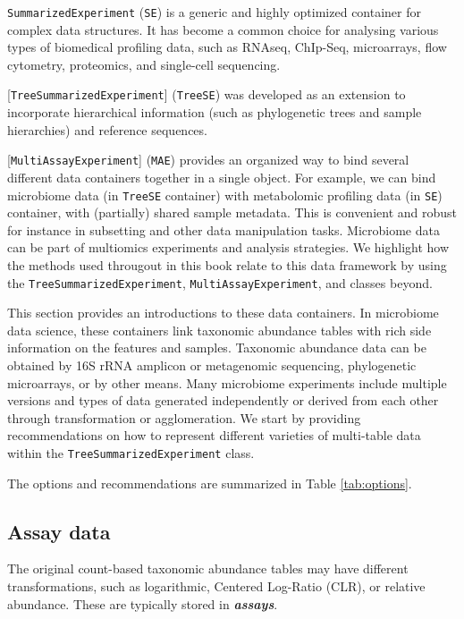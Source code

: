 \documentclass[
]{book}
\begin{document}
\texttt{SummarizedExperiment} (\texttt{SE}) \citep{R_SummarizedExperiment} is a generic and highly optimized container for complex data
structures. It has become a common choice for analysing various types
of biomedical profiling data, such as RNAseq, ChIp-Seq, microarrays,
flow cytometry, proteomics, and single-cell
sequencing.

{[}\texttt{TreeSummarizedExperiment}{]} (\texttt{TreeSE}) \citep{R_TreeSummarizedExperiment} was developed as an extension to incorporate hierarchical
information (such as phylogenetic trees and sample hierarchies) and
reference sequences.

{[}\texttt{MultiAssayExperiment}{]} (\texttt{MAE}) \citep{Ramos2017} provides an organized
way to bind several different data containers together in a single
object. For example, we can bind microbiome data (in \texttt{TreeSE}
container) with metabolomic profiling data (in \texttt{SE}) container, with
(partially) shared sample metadata. This is convenient and robust for
instance in subsetting and other data manipulation tasks. Microbiome
data can be part of multiomics experiments and analysis strategies. We
highlight how the methods used througout in this book relate to this
data framework by using the \texttt{TreeSummarizedExperiment},
\texttt{MultiAssayExperiment}, and classes beyond.

This section provides an introductions to these data containers. In
microbiome data science, these containers link taxonomic abundance
tables with rich side information on the features and
samples. Taxonomic abundance data can be obtained by 16S rRNA amplicon
or metagenomic sequencing, phylogenetic microarrays, or by other
means. Many microbiome experiments include multiple versions and types
of data generated independently or derived from each other through
transformation or agglomeration. We start by providing recommendations
on how to represent different varieties of multi-table data within the
\texttt{TreeSummarizedExperiment} class.

The options and recommendations are summarized in Table \ref{tab:options}.

\hypertarget{assay-slot}{%
\subsection{Assay data}\label{assay-slot}}

The original count-based taxonomic abundance tables may have different
transformations, such as logarithmic, Centered Log-Ratio (CLR), or relative
abundance. These are typically stored in \emph{\textbf{assays}}.
\end{document}

